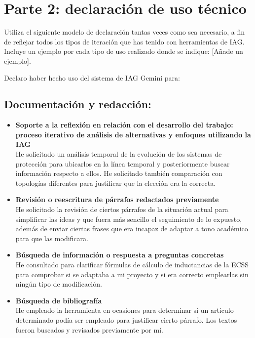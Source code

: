 \documentclass[12pt]{report} %
\begin{document}
\section*{Parte 2: declaración de uso técnico}

Utiliza el siguiente modelo de declaración tantas veces como sea necesario, a fin de reflejar todos los tipos de iteración que has tenido con herramientas de IAG. Incluye un ejemplo por cada tipo de uso realizado donde se indique: [Añade un ejemplo].

\vspace{0.5em}
\noindent Declaro haber hecho uso del sistema de IAG Gemini para:

\subsection*{Documentación y redacción:}
\begin{itemize}
    \item \textbf{Soporte a la reflexión en relación con el desarrollo del trabajo: proceso iterativo de análisis de alternativas y enfoques utilizando la IAG} \\
    He solicitado un análisis temporal de la evolución de los sistemas de protección para ubicarlos en la línea temporal y posteriormente buscar información respecto a ellos. He solicitado también comparación con topologías diferentes para justificar que la elección era la correcta.
    
    \item \textbf{Revisión o reescritura de párrafos redactados previamente} \\
    He solicitado la revisión de ciertos párrafos de la situación actual para simplificar las ideas y que fuera más sencillo el seguimiento de lo expuesto, además de enviar ciertas frases que era incapaz de adaptar a tono académico para que las modificara.
    
    \item \textbf{Búsqueda de información o respuesta a preguntas concretas} \\
    He consultado para clarificar fórmulas de cálculo de inductancias de la ECSS para comprobar si se adaptaba a mi proyecto y si era correcto emplearlas sin ningún tipo de modificación.
    
    \item \textbf{Búsqueda de bibliografía} \\
    He empleado la herramienta en ocasiones para determinar si un artículo determinado podía ser empleado para justificar cierto párrafo. Los textos fueron buscados y revisados previamente por mí.
\end{itemize}
\end{document}

